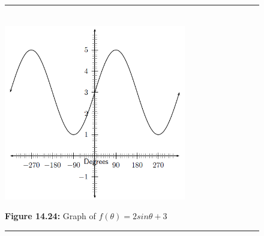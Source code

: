 \begin{figure}[H] %
\begin{center}
\rule[.1in]{\figurerulewidth}{.005in} \\
\label{m39414*uid33!!!underscore!!!media}\label{m39414*uid33!!!underscore!!!printimage}\includegraphics[width=300px]{col11306.imgs/m39414_trigrep.png} %
\vspace{2pt}
\vspace{\rubberspace}\par \begin{cnxcaption}
\small \textbf{Figure 14.24: }Graph of $f\left(\theta \right)=2sin\theta +3$
\end{cnxcaption}
\vspace{.1in}
\rule[.1in]{\figurerulewidth}{.005in} \\
\end{center}
\end{figure}       
\label{m39414*secfhsst!!!underscore!!!id2083}
\nopagebreak
